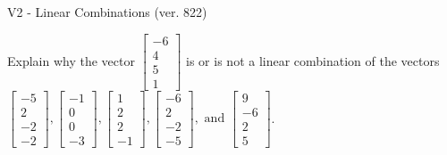 \begin{exercise}
  \begin{exerciseTitle}V2 - Linear Combinations (ver. 822)\end{exerciseTitle}
  \begin{exerciseStatement}
    Explain why the vector \(\left[\begin{array}{c}
-6 \\
4 \\
5 \\
1
\end{array}\right]\)  is or is not a linear 
	combination of the vectors \(\left[\begin{array}{c}
-5 \\
2 \\
-2 \\
-2
\end{array}\right] , \left[\begin{array}{c}
-1 \\
0 \\
0 \\
-3
\end{array}\right] , \left[\begin{array}{c}
1 \\
2 \\
2 \\
-1
\end{array}\right] , \left[\begin{array}{c}
-6 \\
2 \\
-2 \\
-5
\end{array}\right] , \text{ and } \left[\begin{array}{c}
9 \\
-6 \\
2 \\
5
\end{array}\right]\).
	



\end{exerciseStatement}
\end{exercise}
